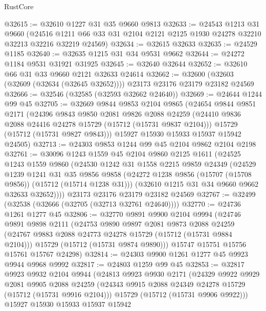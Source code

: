\begin{lexlean}{RustCore}
\begin{coremodule}
@32615 := @32610 @1227 @31 @35 @9660 @9813
@32633 := @24543
    @1213
    @31
    @9660
    (@24516 @1211 @66 @33 @31 @2104 @2121 @2125 @1930 @24278 @32210 @32213 @32216 @32219 @24569)
@32634 := @32615 @32633
@32635 := @24529 @1185
@32640 := @32635 @1215 @31 @34 @9531 @9662
@32644 := @24272 @1184 @9531 @31921 @31925
@32645 := @32640 @32644
@32652 := @32610 @66 @31 @33 @9660 @2121 @32633 @24614
@32662 := @32600 (@32603 (@32609 (@32634 (@32645 @32652)))) @23173 @23176 @23179 @23182 @24569
@32666 := @32546 (@32585 (@32593 @32662 @24640))
@32669 := @24644 @1244 @99 @45
@32705 := @32669
    @9844
    @9853
    @2104
    @9865
    (@24654
      @9844
      @9851
      @2171
      (@24396
        @9843
        @9850
        @2081
        @9826
        @2088
        @24259
        (@24410 @9836 @2088 @24416 @24278 @15729 (@15712 (@15731 @9837 @2104)))
        @15729
        (@15712 (@15731 @9827 @9843)))
      @15927
      @15930
      @15933
      @15937
      @15942
      @24505)
@32713 := @24303 @9853 @1244 @99 @45 @2104 @9862 @2104 @2198
@32761 := @30096
    @1243
    @1559
    @45
    @2104
    @9860
    @2125
    @1611
    (@24525
      @1243
      @1559
      @9860
      (@24530
        @1242
        @31
        @1558
        @2215
        @9859
        @24349
        (@24529
          @1239
          @1241
          @31
          @35
          @9856
          @9858
          (@24272 @1238 @9856 (@15707 (@15708 @9856)) (@15712 (@15714 @1238 @31)))
          (@32610 @1215 @31 @34 @9660 @9662 @32633 @32652))))
    @23173
    @23176
    @23179
    @23182
    @24569
@32767 := @32499 (@32538 (@32666 (@32705 (@32713 @32761 @24640))))
@32770 := @24736 @1261 @1277 @45
@32806 := @32770
    @9891
    @9900
    @2104
    @9994
    (@24746
      @9891
      @9898
      @2111
      (@24753
        @9890
        @9897
        @2081
        @9873
        @2088
        @24259
        (@24767 @9883 @2088 @24773 @24278 @15729 (@15712 (@15731 @9884 @2104)))
        @15729
        (@15712 (@15731 @9874 @9890)))
      @15747
      @15751
      @15756
      @15761
      @15767
      @24298)
@32814 := @24303 @9900 @1261 @1277 @45 @9923 @9944 @9968 @9992
@32817 := @24803 @1259 @99 @45
@32853 := @32817
    @9923
    @9932
    @2104
    @9944
    (@24813
      @9923
      @9930
      @2171
      (@24329
        @9922
        @9929
        @2081
        @9905
        @2088
        @24259
        (@24343 @9915 @2088 @24349 @24278 @15729 (@15712 (@15731 @9916 @2104)))
        @15729
        (@15712 (@15731 @9906 @9922)))
      @15927
      @15930
      @15933
      @15937
      @15942

\end{coremodule}
\end{lexlean}
